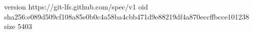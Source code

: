 version https://git-lfs.github.com/spec/v1
oid sha256:e089d509cf108a85e0b0c4a58ba4cbb471d9e88219df4a870eccffbcce101238
size 5403

